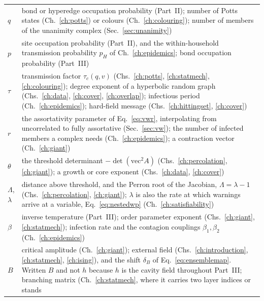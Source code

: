 \begin{longtable}{@{}L{1.28in}@{\hspace{0.8em}}L{2.48in}@{}}
$q$ & bond or hyperedge occupation probability (Part~II); number of Potts
      states (Ch.~\ref{ch:potts}) or colours (Ch.~\ref{ch:colouring}); number
      of members of the unanimity complex (Sec.~\ref{sec:unanimity})\\[3pt]
$p$ & site occupation probability (Part~II), and the within-household
      transmission probability $p_{H}$ of Ch.~\ref{ch:epidemics}; bond
      occupation probability (Part~III)\\[3pt]
$\tau$ & transmission factor $\tau_{c}(q,v)$ (Chs.~\ref{ch:potts},
         \ref{ch:statmech}, \ref{ch:colouring}); degree exponent of a
         hyperbolic random graph (Chs.~\ref{ch:data}, \ref{ch:cover},
         \ref{ch:overlap}); infectious period (Ch.~\ref{ch:epidemics});
         hard-field message (Chs.~\ref{ch:hittingset},
         \ref{ch:cover})\\[3pt]
$r$ & the assortativity parameter of Eq.~\eqref{eq:vwr}, interpolating from
      uncorrelated to fully assortative (Sec.~\ref{sec:vw}); the number of
      infected members a complex needs (Ch.~\ref{ch:epidemics}); a contraction
      vector (Ch.~\ref{ch:giant})\\[3pt]
$\theta$ & the threshold determinant $-\det(\mathrm{vec}^{2}A)$
           (Chs.~\ref{ch:percolation}, \ref{ch:giant}); a growth or core
           exponent (Chs.~\ref{ch:data}, \ref{ch:cover})\\[3pt]
$\Lambda$, $\lambda$ & distance above threshold, and the Perron root of the
                       Jacobian, $\Lambda=\lambda-1$ (Chs.~\ref{ch:percolation},
                       \ref{ch:giant}); $\lambda$ is also the rate at which
                       warnings arrive at a variable, Eq.~\eqref{eq:nestedwp}
                       (Ch.~\ref{ch:satisfiability})\\[3pt]
$\beta$ & inverse temperature (Part~III); order parameter exponent
          (Chs.~\ref{ch:giant}, \ref{ch:statmech}); infection rate and the
          contagion couplings $\beta_{1},\beta_{2}$
          (Ch.~\ref{ch:epidemics})\\[3pt]
$B$ & critical amplitude (Ch.~\ref{ch:giant}); external field
      (Chs.~\ref{ch:introduction}, \ref{ch:statmech}, \ref{ch:ising}), and the
      shift $\delta_{B}$ of Eq.~\eqref{eq:ensemblemap}. Written $B$ and not
      $h$ because $h$ is the cavity field throughout Part~III; branching matrix
      (Ch.~\ref{ch:statmech}, where it carries two layer indices or stands

\end{longtable}
